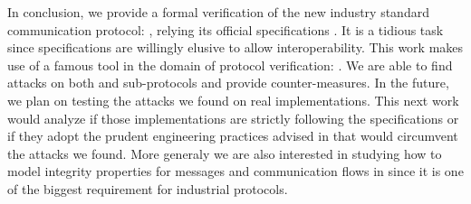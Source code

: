 In conclusion, we provide a formal verification of the new industry standard
communication protocol: \opcua, relying its official specifications
\cite{MLD09,opcua_part2,opcua_part4,opcua_part6}.
It is a tidious task since specifications are willingly elusive to allow
interoperability.
This work makes use of a famous tool in the domain of protocol verification:
\proverif.
We are able to find attacks on both \securechan and \session sub-protocols and
provide counter-measures.
In the future, we plan on testing the attacks we found on real implementations.
This next work would analyze if those implementations are strictly following
the specifications or if they adopt the prudent engineering practices advised in
\cite{AN96} that would circumvent the attacks we found.
More generaly we are also interested in studying how to model integrity
properties for messages and communication flows in \proverif since it is one of
the biggest requirement for industrial protocols.
